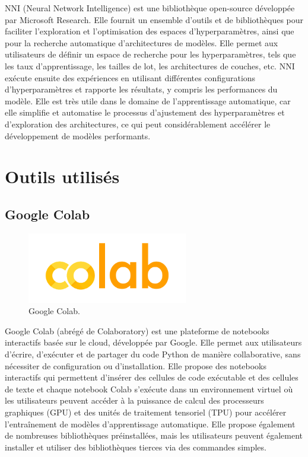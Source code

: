 NNI (Neural Network Intelligence) est une bibliothèque open-source développée par Microsoft Research. Elle fournit un ensemble d'outils et de bibliothèques pour faciliter l'exploration et l'optimisation des espaces d'hyperparamètres, ainsi que pour la recherche automatique d'architectures de modèles. Elle permet aux utilisateurs de définir un espace de recherche pour les hyperparamètres, tels que les taux d'apprentissage, les tailles de lot, les architectures de couches, etc. NNI exécute ensuite des expériences en utilisant différentes configurations d'hyperparamètres et rapporte les résultats, y compris les performances du modèle. Elle est très utile dans le domaine de l'apprentissage automatique, car elle simplifie et automatise le processus d'ajustement des hyperparamètres et d'exploration des architectures, ce qui peut considérablement accélérer le développement de modèles performants.

\section{Outils utilisés}

\subsection{Google Colab}

\begin{figure}[hbt!]
  \centering
  \includegraphics[width=7cm]{images_pfe/colab.png}
  \caption{Google Colab.}
  \label{fig:colab}
\end{figure}
\FloatBarrier
\medskip

Google Colab (abrégé de Colaboratory) est une plateforme de notebooks interactifs basée sur le cloud, développée par Google. Elle permet aux utilisateurs d'écrire, d'exécuter et de partager du code Python de manière collaborative, sans nécessiter de configuration ou d'installation. Elle propose des notebooks interactifs qui permettent d'insérer des cellules de code exécutable et des cellules de texte et chaque notebook Colab s'exécute dans un environnement virtuel où les utilisateurs peuvent accéder à la puissance de calcul des processeurs graphiques (GPU) et des unités de traitement tensoriel (TPU) pour accélérer l'entraînement de modèles d'apprentissage automatique. Elle propose également de nombreuses bibliothèques préinstallées, mais les utilisateurs peuvent également installer et utiliser des bibliothèques tierces via des commandes simples.

